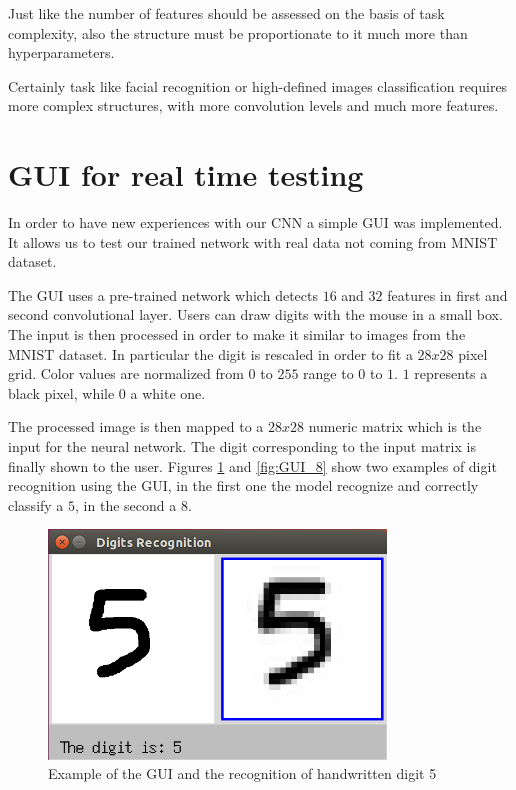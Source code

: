 Just like the number of features should be assessed on the basis of task complexity, also the structure must be proportionate to it much more than hyperparameters.

Certainly task like facial recognition or high-defined images classification requires more complex structures, with more convolution levels and much more features.

\section{GUI for real time testing}

In order to have new experiences with our \acs{CNN} a simple \acs{GUI} was implemented. It allows us to test our trained network with real data not coming from MNIST dataset.

The \acs{GUI} uses a pre-trained network which detects $16$ and $32$ features in first and second convolutional layer. Users can draw digits with the mouse in a small box. The input is then processed in order to make it similar to images from the MNIST dataset. In particular the digit is rescaled in order to fit a $28x28$ pixel grid. Color values are normalized from $0$ to $255$ range to $0$ to $1$. $1$ represents a black pixel, while $0$ a white one.

The processed image is then mapped to a $28x28$ numeric matrix which is the input for the neural network. The digit corresponding to the input matrix is finally shown to the user. Figures \ref{fig:GUI_5} and \ref{fig:GUI_8} show two examples of digit recognition using the \acs{GUI}, in the first one the model recognize and correctly classify a $5$, in the second a $8$.

\begin{figure}
	\caption{Example of the GUI and the recognition of handwritten digit 5}
	\label{fig:GUI_5}
	\centering
	\includegraphics[width=0.8\textwidth]{Images/GUI_5}
\end{figure}

